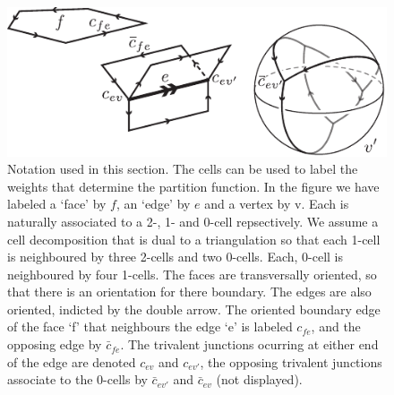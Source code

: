 \documentclass[12pt,a4paper]{article}
\newcounter{arrow}
\begin{document}
\begin{figure}
\begin{center}
\includegraphics{NotationStateSum.pdf}
\caption{\label{NotationStateSum}
Notation used in this section. 
The cells can be used to label the weights that determine the partition function.
In the figure we have labeled a `face' by $f$, an `edge' by $e$ and a vertex by v. 
Each is naturally associated to a 2-, 1- and 0-cell repsectively. 
We assume a cell decomposition that is dual to a triangulation so that each 1-cell is neighboured by three 2-cells and two 0-cells. 
Each, 0-cell is neighboured by four 1-cells. 
The faces are transversally oriented, so that there is an orientation for there boundary. 
The edges are also oriented, indicted by the double arrow. 
The oriented boundary edge of the face `f' that neighbours the edge `e' is labeled $c_{fe}$, 
and the opposing edge by $\bar{c}_{fe}$. 
The trivalent junctions ocurring at either end of the edge are denoted $c_{ev}$ and $c_{ev'}$, the opposing trivalent junctions associate to the 0-cells by $\bar{c}_{ev'}$ and $\bar{c}_{ev}$ (not displayed).
}
\end{center}
\end{figure}
\end{document}
